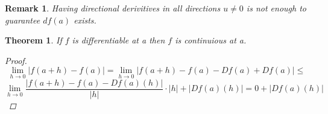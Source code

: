 \documentclass[12pt]{article}
\newtheorem{theorem}{Theorem}[section]
\newtheorem*{remark}{Remark}
\begin{document}
\begin{remark}
Having  directional derivitives in all directions $u\neq 0$ is not enough to guarantee $df(a)$ exists.
\end{remark}

\begin{theorem}
If $f$ is differentiable at a then $f$ is continuious at a.
\begin{proof}
\[\lim_{h \to 0}|f(a+h)-f(a)| = \lim_{h \to 0}|f(a+h)-f(a) -Df(a) + Df(a)| \leq\] 
\[ \lim_{h \to 0}\frac{|f(a+h)-f(a) -Df(a)(h)|}{|h|}\cdot|h| +| Df(a)(h)| = 0 +| Df(a)(h)|\]
\end{proof}
\end{theorem}
\end{document}
